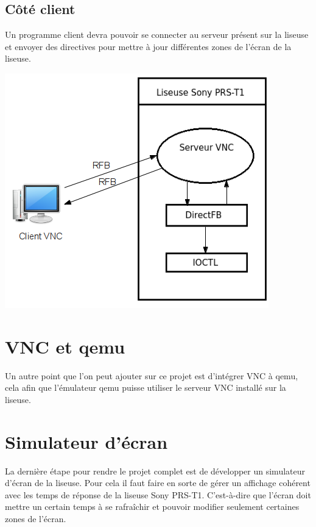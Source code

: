 \subsection{Côté client}

Un programme client devra pouvoir se connecter au serveur présent sur la liseuse et envoyer des directives pour mettre à jour différentes zones de l'écran de la liseuse.

\begin{center}
	\includegraphics{VNCClientServeur.png}
\end{center}

\section{VNC et qemu}

Un autre point que l'on peut ajouter sur ce projet est d'intégrer VNC à qemu, cela afin que l'émulateur qemu puisse utiliser le serveur VNC installé sur la liseuse.


\section{Simulateur d'écran}

La dernière étape pour rendre le projet complet est de développer un simulateur d'écran de la liseuse. Pour cela il faut faire en sorte de gérer un affichage cohérent avec les temps de réponse de la liseuse Sony PRS-T1. C'est-à-dire que l'écran doit mettre un certain temps à se rafraîchir et pouvoir modifier seulement certaines zones de l'écran.